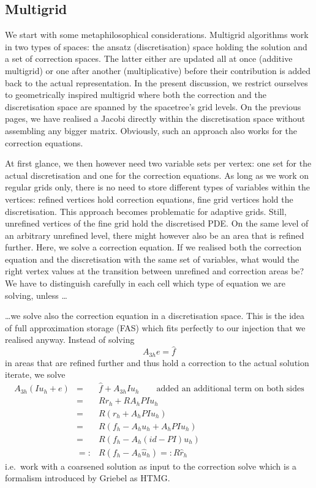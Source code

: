 \subsection{Multigrid}

We start with some metaphilosophical considerations.
Multigrid algorithms work in two types of spaces: the ansatz
(discretisation) space holding the solution and a set of correction spaces.
The latter either are updated all at once (additive multigrid) or one after
another (multiplicative) before their contribution is added back to the actual
representation.
In the present discussion, we restrict ourselves to geometrically inspired
multigrid where both the correction and the discretisation space are spanned by
the spacetree's grid levels.
On the previous pages, we have realised a Jacobi directly within the
discretisation space without assembling any bigger matrix.
Obviously, such an approach also works for the correction equations.



At first glance, we then however need two variable sets per vertex: one set for
the actual discretisation and one for the correction equations.
As long as we work on regular grids only, there is no need to store different
types of variables within the vertices: refined vertices hold correction
equations, fine grid vertices hold the discretisation.
This approach becomes problematic for adaptive grids. 
Still, unrefined vertices of the fine grid hold the discretised PDE. 
On the same level of an arbitrary unrefined level, there might however also be
an area that is refined further.
Here, we solve a correction equation. 
If we realised both the correction equation and the discretisation with the same
set of variables, what would the right vertex values at the transition between
unrefined and correction areas be? 
We have to distinguish carefully in each cell which type of equation we are
solving, unless \ldots


\ldots we solve also the correction equation in a discretisation space. This is
the idea of full approximation storage (FAS) which fits perfectly to our
injection that we realised anyway. Instead of solving
\[ 
  A_{3h} e = \hat f 
\]
in areas that are refined further and thus hold a correction to the actual
solution iterate, we solve
\begin{eqnarray*}
  A_{3h} \left( Iu_h + e \right)  & = & \hat f +  A_{3h} Iu_h \qquad \mbox{added
  an additional term on both sides} \\
  & = & R r_h + RA_hPIu_h \\
  & = & R \left( r_h + A_hPIu_h \right) \\
  & = & R \left( f_h - A_hu_h + A_hPIu_h \right) \\
  & = & R \left( f_h - A_h\left( id - PI\right)u_h \right) \\
  & =: & R \left( f_h - A_h \hat u_h \right)  =: R \hat r_h  
\end{eqnarray*}
i.e.~work with a coarsened solution as input to the correction solve 
which is a formalism introduced by Griebel as HTMG.


